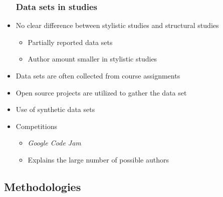 \documentclass[t,12pt,pdftex]{beamer}
\begin{document}
\begin{frame}
	\begin{itemize}
		\frametitle{Data sets in studies}
		\item No clear difference between stylistic studies and structural studies
		\begin{itemize}
			\item Partially reported data sets
			\item Author amount smaller in stylistic studies
		\end{itemize}
	\end{itemize}

\begin{table}[ht]
\centering
{}
\caption{Reported data sets used in papers}
\label{table:data}
\end{table}
\end{frame}

\begin{frame}
	\vspace{0.5in}
	\begin{itemize}
		\item Data sets are often collected from course assignments
		\item Open source projects are utilized to gather the data set
		\item Use of synthetic data sets
		\item Competitions
		\begin{itemize}
			\item \textit{Google Code Jam}
			\item Explains the large number of possible authors
		\end{itemize}
	\end{itemize}
\end{frame}

\subsection{Methodologies}
\end{document}
